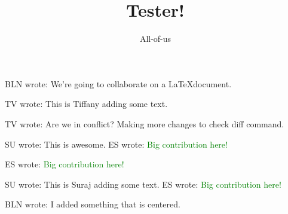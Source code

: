 \documentclass[12pt]{article}
\title{Tester!}
\author{All-of-us}
\newcommand{\bln}[1]{BLN wrote: \textcolor{red!70!blue!70}{#1}}
\newcommand{\tv}[1]{TV wrote: \textcolor{blue!70}{#1}}
\newcommand{\su}[1]{SU wrote: \textcolor{green!70}{#1}}
\newcommand{\es}[1]{ES wrote: \textcolor{green}{#1}}
\begin{document}
\maketitle

\bln{We're going to collaborate on a \LaTeX document.}

\tv{This is Tiffany adding some text.}

\tv{Are we in conflict? Making more changes to check diff command.}

\su{This is awesome.}
\es{Big contribution here!}



\es{Big contribution here!}

\su{This is Suraj adding some text.}
\es{Big contribution here!}


\begin{center}
  \bln{I added something that is centered.}
\end{center}
\end{document}
